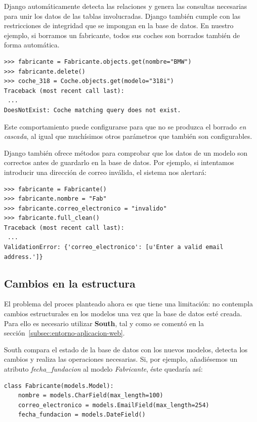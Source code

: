 Django automáticamente detecta las relaciones y genera las consultas necesarias
para unir los datos de las tablas involucradas. Django también cumple con las
restricciones de integridad que se impongan en la base de datos. En nuestro
ejemplo, si borramos un fabricante, todos sus coches son borrados también de
forma automática.

\begin{verbatim}
>>> fabricante = Fabricante.objects.get(nombre="BMW") 
>>> fabricante.delete()
>>> coche_318 = Coche.objects.get(modelo="318i")
Traceback (most recent call last):
 ...
DoesNotExist: Coche matching query does not exist.
\end{verbatim}

Este comportamiento puede configurarse para que no se produzca el borrado
\textit{en cascada}, al igual que muchísimos otros parámetros que también son
configurables.

Django también ofrece métodos para comprobar que los datos de un modelo son
correctos antes de guardarlo en la base de datos. Por ejemplo, si intentamos
introducir una dirección de correo inválida, el sistema nos alertará:

\begin{verbatim}
>>> fabricante = Fabricante()
>>> fabricante.nombre = "Fab"
>>> fabricante.correo_electronico = "invalido"
>>> fabricante.full_clean()
Traceback (most recent call last):
 ...
ValidationError: {'correo_electronico': [u'Enter a valid email address.']}
\end{verbatim}


\subsection{Cambios en la estructura}

El problema del proces planteado ahora es que tiene una limitación: no contempla
cambios estructurales en los modelos una vez que la base de datos esté
creada. Para ello es necesario utilizar \textbf{South}, tal y como se comentó en
la sección~\ref{subsec:entorno-aplicacion-web}. 

South compara el estado de la base de datos con los nuevos modelos, detecta los
cambios y realiza las operaciones necesarias. Si, por ejemplo, añadiésemos un
atributo \textit{fecha\_fundacion} al modelo \textit{Fabricante}, éste quedaría
así:

\begin{verbatim}
class Fabricante(models.Model):
    nombre = models.CharField(max_length=100)
    correo_electronico = models.EmailField(max_length=254)
    fecha_fundacion = models.DateField()
  
\end{verbatim}

